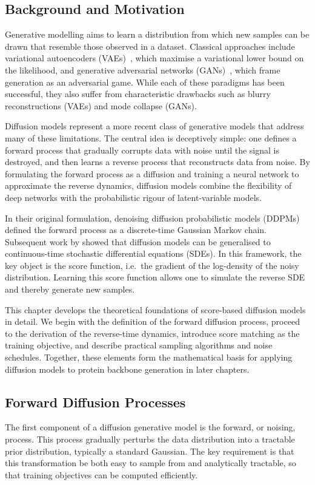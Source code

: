 \documentclass[a4paper,12pt]{article}
\begin{document}
\subsection{Background and Motivation}
Generative modelling aims to learn a distribution from which new samples can be drawn that resemble those observed in a dataset. Classical approaches include variational autoencoders (VAEs)~\citep{kingma2022AutoEncodingVariationalBayes}, which maximise a variational lower bound on the likelihood, and generative adversarial networks (GANs)~\citep{goodfellow2020GenerativeAdversarialNetworks}, which frame generation as an adversarial game. While each of these paradigms has been successful, they also suffer from characteristic drawbacks such as blurry reconstructions (VAEs) and mode collapse (GANs).

Diffusion models represent a more recent class of generative models that address many of these limitations. The central idea is deceptively simple: one defines a forward process that gradually corrupts data with noise until the signal is destroyed, and then learns a reverse process that reconstructs data from noise. By formulating the forward process as a diffusion and training a neural network to approximate the reverse dynamics, diffusion models combine the flexibility of deep networks with the probabilistic rigour of latent-variable models. 

In their original formulation, denoising diffusion probabilistic models (DDPMs)~\citep{hoDenoisingDiffusionProbabilistic2020} defined the forward process as a discrete-time Gaussian Markov chain. Subsequent work by \citet{song2021ScoreBasedGenerativeModeling} showed that diffusion models can be generalised to continuous-time stochastic differential equations (SDEs). In this framework, the key object is the score function, i.e.~the gradient of the log-density of the noisy distribution. Learning this score function allows one to simulate the reverse SDE and thereby generate new samples.

This chapter develops the theoretical foundations of score-based diffusion models in detail. We begin with the definition of the forward diffusion process, proceed to the derivation of the reverse-time dynamics, introduce score matching as the training objective, and describe practical sampling algorithms and noise schedules. Together, these elements form the mathematical basis for applying diffusion models to protein backbone generation in later chapters.

\subsection{Forward Diffusion Processes}
The first component of a diffusion generative model is the forward, or noising, process. 
This process gradually perturbs the data distribution into a tractable prior distribution, typically a standard Gaussian. The key requirement is that this transformation be both easy to sample from and analytically tractable, so that training objectives can be computed efficiently.
\end{document}
